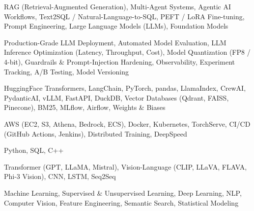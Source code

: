 \documentclass[letter,10pt]{article}
\begin{document}
 RAG (Retrieval-Augmented Generation), Multi-Agent Systems, Agentic AI Workflows, Text2SQL / Natural-Language-to-SQL, PEFT / LoRA Fine-tuning, Prompt Engineering, Large Language Models (LLMs), Foundation Models\par\vspace{2pt}

 Production-Grade LLM Deployment, Automated Model Evaluation, LLM Inference Optimization (Latency, Throughput, Cost), Model Quantization (FP8 / 4-bit), Guardrails \& Prompt-Injection Hardening, Observability, Experiment Tracking, A/B Testing, Model Versioning\par\vspace{2pt}

 HuggingFace Transformers, LangChain, PyTorch, pandas, LlamaIndex, CrewAI, PydanticAI, vLLM, FastAPI, DuckDB, Vector Databases (Qdrant, FAISS, Pinecone), BM25, MLflow, Airflow, Weights \& Biases\par\vspace{2pt}

 AWS (EC2, S3, Athena, Bedrock, ECS), Docker, Kubernetes, TorchServe, CI/CD (GitHub Actions, Jenkins), Distributed Training, DeepSpeed\par\vspace{2pt}

 Python, SQL, C++\par\vspace{2pt}

 Transformer (GPT, LLaMA, Mistral), Vision-Language (CLIP, LLaVA, FLAVA, Phi-3 Vision), CNN, LSTM, Seq2Seq\par\vspace{2pt}

 Machine Learning, Supervised \& Unsupervised Learning, Deep Learning, NLP, Computer Vision, Feature Engineering, Semantic Search, Statistical Modeling
\end{document}
